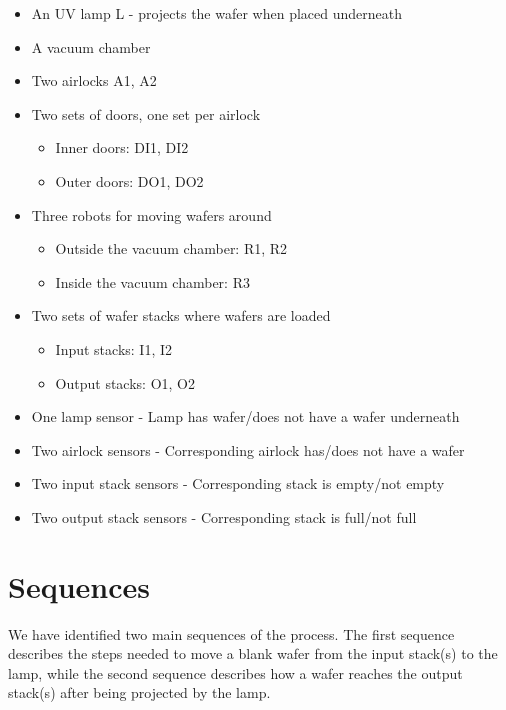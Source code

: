 \begin{itemize}
	\item An UV lamp L - projects the wafer when placed underneath
	\item A vacuum chamber
	\item Two airlocks A1, A2
	
	\item Two sets of doors, one set per airlock
	\begin{itemize}
		\item Inner doors: DI1, DI2
		\item Outer doors: DO1, DO2
	\end{itemize}
	
	\item Three robots for moving wafers around
	\begin{itemize}
		\item Outside the vacuum chamber: R1, R2
		\item Inside the vacuum chamber: R3
	\end{itemize}
	
	\item Two sets of wafer stacks where wafers are loaded
	\begin{itemize}
		\item Input stacks: I1, I2
		\item Output stacks: O1, O2
	\end{itemize}
	
	\item One lamp sensor - Lamp has wafer/does not have a wafer underneath
	\item Two airlock sensors - Corresponding airlock has/does not have a wafer
	\item Two input stack sensors - Corresponding stack is empty/not empty
	\item Two output stack sensors - Corresponding stack is full/not full
	
\end{itemize}

\section{Sequences}

We have identified two main sequences of the process. The first sequence describes the steps needed to move a blank wafer from the input stack(s) to the lamp, while the second sequence describes how a wafer reaches the output stack(s) after being projected by the lamp.

